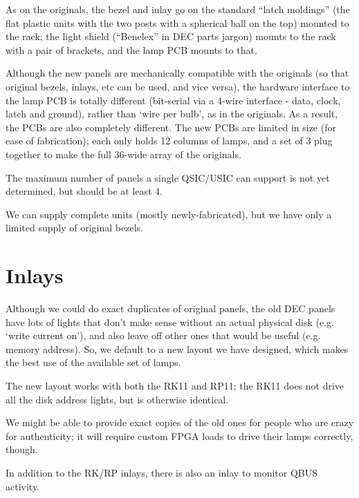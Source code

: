 As on the originals, the bezel and inlay go on the standard ``latch moldings''
(the flat plastic units with the two posts with a spherical ball on the top)
mounted to the rack; the light shield (``Benelex'' in DEC parts jargon) mounts
to the rack with a pair of brackets, and the lamp PCB mounts to that.

Although the new panels are mechanically compatible with the originals (so
that original bezels, inlays, etc can be used, and vice versa), the hardware
interface to the lamp PCB is totally different (bit-serial via a 4-wire
interface - data, clock, latch and ground), rather than `wire per bulb', as
in the originals. As a result, the PCBs are also completely different. The
new PCBs are limited in size (for ease of fabrication); each only holds 12
columns of lamps, and a set of 3 plug together to make the full 36-wide array
of the originals.

The maximum number of panels a single QSIC/USIC can support is not yet
determined, but should be at least 4.

We can supply complete units (mostly newly-fabricated), but we have only a
limited supply of original bezels.

\section{Inlays}

Although we could do exact duplicates of original panels, the old DEC panels
have lots of lights that don't make sense without an actual physical disk
(e.g. `write current on'), and also leave off other ones that would be useful
(e.g. memory address). So, we default to a new layout we have designed, which
makes the best use of the available set of lamps.

The new layout works with both the RK11 and RP11; the RK11 does not drive all
the disk address lights, but is otherwise identical.

We might be able to provide exact copies of the old ones for people who are
crazy for authenticity; it will require custom FPGA loads to drive their
lamps correctly, though.

In addition to the RK/RP inlays, there is also an inlay to monitor QBUS
activity.

